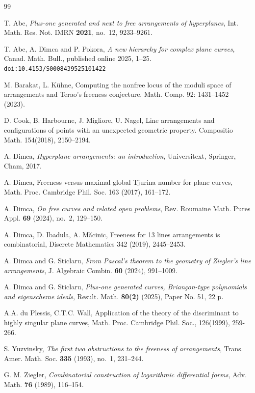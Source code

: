 \documentclass[11pt]{amsart}
\theoremstyle{plain}
\theoremstyle{definition}
\numberwithin{equation}{section}
\begin{document}
\begin{thebibliography}{99}

T. Abe,
\emph{Plus-one generated and next to free arrangements of hyperplanes},
Int. Math. Res. Not. IMRN \textbf{2021}, no.~12, 9233--9261.

T. Abe, A. Dimca and P. Pokora,
\emph{A new hierarchy for complex plane curves},
Canad. Math. Bull., published online 2025, 1--25. \texttt{doi:10.4153/S0008439525101422}

  M. Barakat, L. K\" uhne, Computing the nonfree locus of the moduli space of arrangements and Terao’s freeness conjecture.
Math. Comp. 92: 1431--1452 (2023).

 D. Cook, B. Harbourne, J. Migliore, U. Nagel,  Line arrangements and configurations of points with an unexpected geometric property. {Compositio Math.} {154}(2018), 2150--2194.

A. Dimca,
\emph{Hyperplane arrangements: an introduction},
Universitext, Springer, Cham, 2017.

  A. Dimca, Freeness versus maximal global Tjurina number for plane curves, 
Math. Proc. Cambridge Phil. Soc.  163 (2017), 161--172.

A. Dimca,
\emph{On free curves and related open problems},
Rev. Roumaine Math. Pures Appl. \textbf{69} (2024), no.~2, 129--150.

 A. Dimca, D. Ibadula, A. M\u acinic,
Freeness for 13 lines arrangements is combinatorial, Discrete Mathematics 342 (2019), 2445--2453.

A. Dimca and G. Sticlaru,
\emph{From Pascal's theorem to the geometry of Ziegler's line arrangements},
J. Algebraic Combin. \textbf{60} (2024), 991--1009.

A. Dimca and G. Sticlaru, 
\textit{Plus-one generated curves, Briançon-type polynomials and eigenscheme ideals}, Result. Math. \textbf{80(2)} (2025), Paper No. 51, 22 p.

 A.A. du Plessis,  C.T.C. Wall, Application of the theory of the
discriminant to highly singular plane curves, Math. Proc. Cambridge
Phil. Soc.,  126(1999), 259-266. 

S. Yuzvinsky,
\emph{The first two obstructions to the freeness of arrangements},
Trans. Amer. Math. Soc. \textbf{335} (1993), no.~1, 231--244.

G. M. Ziegler,
\emph{Combinatorial construction of logarithmic differential forms},
Adv. Math. \textbf{76} (1989), 116--154.

\end{thebibliography}
\end{document}
